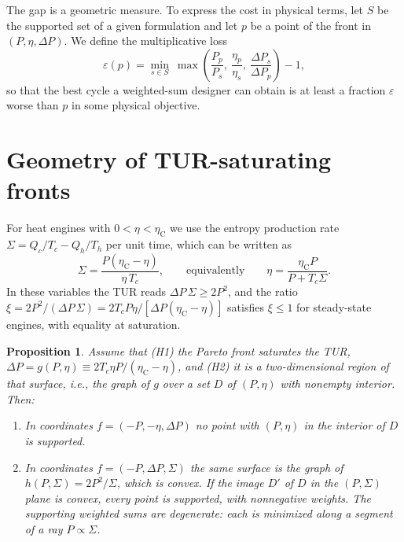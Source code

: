 \documentclass[pre,twocolumn,superscriptaddress,nofootinbib,longbibliography]{revtex4-2}
\newtheorem{proposition}{Proposition}
\newcommand{\etaC}{\eta_{\mathrm{C}}}
\begin{document}
The gap is a geometric measure. To express the cost in physical terms, let $S$ be the supported
set of a given formulation and let $p$ be a point of the front in $(P,\eta,\Delta P)$. We define the
multiplicative loss
\begin{equation}
\varepsilon(p) = \min_{s \in S}\ \max\!\left(\frac{P_p}{P_s},\ \frac{\eta_p}{\eta_s},\
\frac{\Delta P_s}{\Delta P_p}\right) - 1 ,
\label{eq:eps}
\end{equation}
so that the best cycle a weighted-sum designer can obtain is at least a fraction $\varepsilon$
worse than $p$ in some physical objective.

\section{Geometry of TUR-saturating fronts}
\label{sec:geometry}

For heat engines with $0 < \eta < \etaC$ we use the entropy production rate
$\Sigma = Q_c/T_c - Q_h/T_h$ per unit time, which can be written as
\begin{equation}
\Sigma = \frac{P(\etaC - \eta)}{\eta\,T_c},
\qquad\text{equivalently}\qquad
\eta = \frac{\etaC P}{P + T_c\Sigma}.
\label{eq:sigma}
\end{equation}
In these variables the TUR reads $\Delta P\,\Sigma \ge 2P^2$, and the ratio
$\xi = 2P^2/(\Delta P\,\Sigma) = 2T_c P\eta/[\Delta P(\etaC-\eta)]$ satisfies $\xi \le 1$ for
steady-state engines, with equality at saturation.

\begin{proposition}
\label{prop}
Assume that (H1) the Pareto front saturates the TUR, $\Delta P = g(P,\eta) \equiv
2T_c\eta P/(\etaC - \eta)$, and (H2) it is a two-dimensional region of that surface, i.e., the graph
of $g$ over a set $D$ of $(P,\eta)$ with nonempty interior. Then:
\begin{enumerate}
\item[(i)] In coordinates $f = (-P,-\eta,\Delta P)$ no point with $(P,\eta)$ in the interior of $D$
is supported.
\item[(ii)] In coordinates $f = (-P, \Delta P, \Sigma)$ the same surface is the graph of
$h(P,\Sigma) = 2P^2/\Sigma$, which is convex. If the image $D'$ of $D$ in the $(P,\Sigma)$ plane is
convex, every point is supported, with nonnegative weights. The supporting weighted sums are
degenerate: each is minimized along a segment of a ray $P \propto \Sigma$.
\end{enumerate}
\end{proposition}
\end{document}
